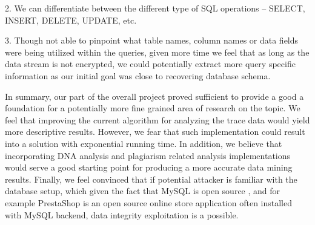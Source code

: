 \documentclass[11pt,a4paper, titlepage, oneside]{article}
\begin{document}
2. We can differentiate between the different type of SQL operations – SELECT, INSERT, DELETE, UPDATE, etc.
      
3. Though not able to pinpoint what table names, column names or data fields were being utilized within the queries, given more time we feel that as long as the data stream is not encrypted, we could potentially extract more query specific information as our initial goal was close to recovering database schema.

In summary, our part of the overall project proved sufficient to provide a good a foundation for a potentially more fine grained area of research on the topic. We feel that improving the current algorithm for analyzing the trace data would yield more descriptive results. However, we fear that such implementation could result into a solution with exponential running time. In addition, we believe that incorporating DNA analysis and plagiarism related analysis implementations would serve a good starting point for producing a more accurate data mining results. Finally, we feel convinced that if potential attacker is familiar with the database setup, which given the fact that MySQL is open source , and for example PrestaShop is an open source online store application often installed with MySQL backend, data integrity exploitation is a possible.
\end{document}
